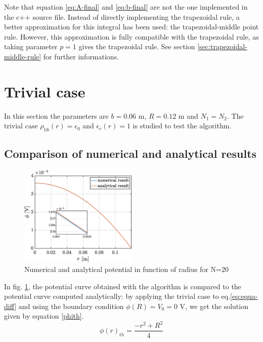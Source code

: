 \documentclass[a4paper,12pt,twoside]{article}
\begin{document}
  Note that equation \eqref{eq:A-final} and \eqref{eq:b-final} are not the one implemented in the c++ source file.
  Instead of directly implementing the trapezoidal rule, a better approximation for this integral has been used: the trapezoidal-middle point rule.
  However, this approximation is fully compatible with the trapezoidal rule, as taking parameter $p=1$ gives the trapezoidal rule.
  See section \ref{sec:trapezoidal-middle-rule} for further informations. %

  \section{Trivial case}

  In this section the parameters are $b=0.06$ m, $R=0.12$ m and $N_1=N_2$. The trivial case $\rho_{lib}(r)=\epsilon_0$ and $\epsilon_r(r)=1$ is studied to test the algorithm.

  \subsection{Comparison of numerical and analytical results}

  \begin{figure}[h!]
   \centering
   \includegraphics[width=0.5\textwidth]{graphs/c_phi.eps}
   \caption{Numerical and analytical potential in function of radius for N=20}
   \label{cphi}
  \end{figure}

  In fig. \ref{cphi}, the potential curve obtained with the algorithm is compared to the potential curve computed analytically: by applying the trivial case to eq.\eqref{eq:equa-diff} and using the boundary condition $\phi(R)=V_0=0$ V, we get the solution given by equation \eqref{phith}.
  \begin{equation}
   \phi(r)_{th} = \frac{-r^2+R^2}{4} %
   \label{phith}
  \end{equation}
\end{document}
